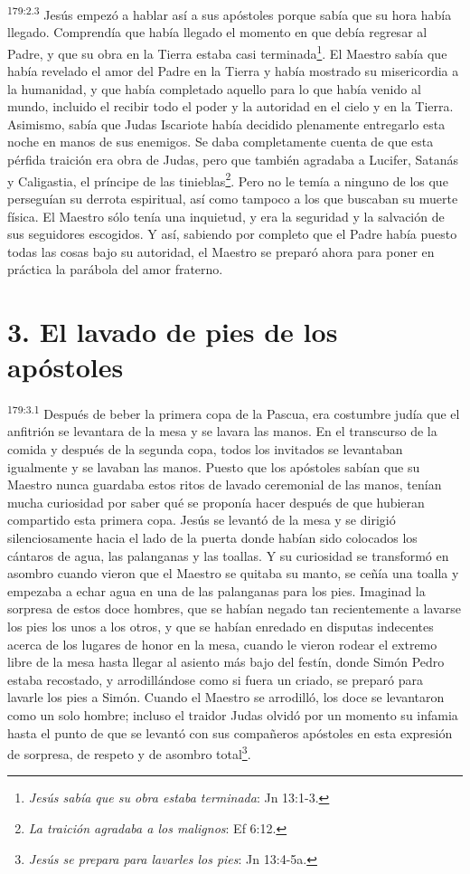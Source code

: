 \par
\textsuperscript{179:2.3} Jesús empezó a hablar así a sus apóstoles porque sabía que su hora había llegado. Comprendía que había llegado el momento en que debía regresar al Padre, y que su obra en la Tierra estaba casi terminada\footnote{\textit{Jesús sabía que su obra estaba terminada}: Jn 13:1-3.}. El Maestro sabía que había revelado el amor del Padre en la Tierra y había mostrado su misericordia a la humanidad, y que había completado aquello para lo que había venido al mundo, incluido el recibir todo el poder y la autoridad en el cielo y en la Tierra. Asimismo, sabía que Judas Iscariote había decidido plenamente entregarlo esta noche en manos de sus enemigos. Se daba completamente cuenta de que esta pérfida traición era obra de Judas, pero que también agradaba a Lucifer, Satanás y Caligastia, el príncipe de las tinieblas\footnote{\textit{La traición agradaba a los malignos}: Ef 6:12.}. Pero no le temía a ninguno de los que perseguían su derrota espiritual, así como tampoco a los que buscaban su muerte física. El Maestro sólo tenía una inquietud, y era la seguridad y la salvación de sus seguidores escogidos. Y así, sabiendo por completo que el Padre había puesto todas las cosas bajo su autoridad, el Maestro se preparó ahora para poner en práctica la parábola del amor fraterno.

\section*{3. El lavado de pies de los apóstoles}
\par
\textsuperscript{179:3.1} Después de beber la primera copa de la Pascua, era costumbre judía que el anfitrión se levantara de la mesa y se lavara las manos. En el transcurso de la comida y después de la segunda copa, todos los invitados se levantaban igualmente y se lavaban las manos. Puesto que los apóstoles sabían que su Maestro nunca guardaba estos ritos de lavado ceremonial de las manos, tenían mucha curiosidad por saber qué se proponía hacer después de que hubieran compartido esta primera copa. Jesús se levantó de la mesa y se dirigió silenciosamente hacia el lado de la puerta donde habían sido colocados los cántaros de agua, las palanganas y las toallas. Y su curiosidad se transformó en asombro cuando vieron que el Maestro se quitaba su manto, se ceñía una toalla y empezaba a echar agua en una de las palanganas para los pies. Imaginad la sorpresa de estos doce hombres, que se habían negado tan recientemente a lavarse los pies los unos a los otros, y que se habían enredado en disputas indecentes acerca de los lugares de honor en la mesa, cuando le vieron rodear el extremo libre de la mesa hasta llegar al asiento más bajo del festín, donde Simón Pedro estaba recostado, y arrodillándose como si fuera un criado, se preparó para lavarle los pies a Simón. Cuando el Maestro se arrodilló, los doce se levantaron como un solo hombre; incluso el traidor Judas olvidó por un momento su infamia hasta el punto de que se levantó con sus compañeros apóstoles en esta expresión de sorpresa, de respeto y de asombro total\footnote{\textit{Jesús se prepara para lavarles los pies}: Jn 13:4-5a.}.

